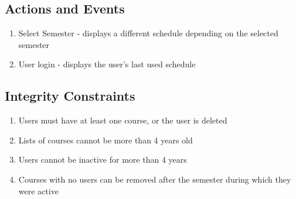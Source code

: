 \documentclass[pdftex,12pt,letter]{article}
\begin{document}
\subsection*{Actions and Events}
\begin{enumerate}[1.]
\item Select Semester - displays a different schedule depending on the selected semester
\item User login - displays the user's last used schedule
\end{enumerate}
\subsection*{Integrity Constraints}
\begin{enumerate}
\item Users must have at least one course, or the user is deleted
\item Lists of courses cannot be more than 4 years old
\item Users cannot be inactive for more than 4 years
\item Courses with no users can be removed after the semester during which they were active
\end{enumerate}
\end{document}
